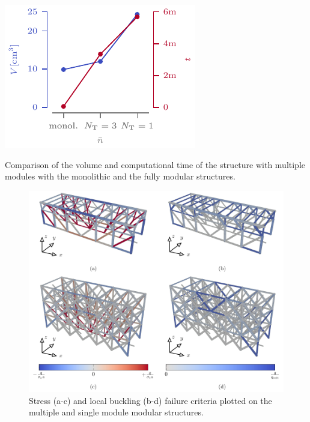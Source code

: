 \begin{marginfigure}
    \centering
    \includegraphics[width=\linewidth]{figures/05_cellular_opt/00_multiple_tab/multi_tab.pdf}
    \caption{Comparison of the volume and computational time of the structure with multiple modules with the monolithic and the fully modular structures.}
    \label{fig:05_multiple_topology_sol_graph}
\end{marginfigure}

\begin{figure}
    \centering
    \includegraphics[width=\linewidth]{figures/05_cellular_opt/00_multiple_failure/mul_mech.pdf}
    \caption{Stress (a-c) and local buckling (b-d) failure criteria plotted on the multiple and single module modular structures.}
    \label{fig:05_multiple_topology_sol_mech}
\end{figure}


